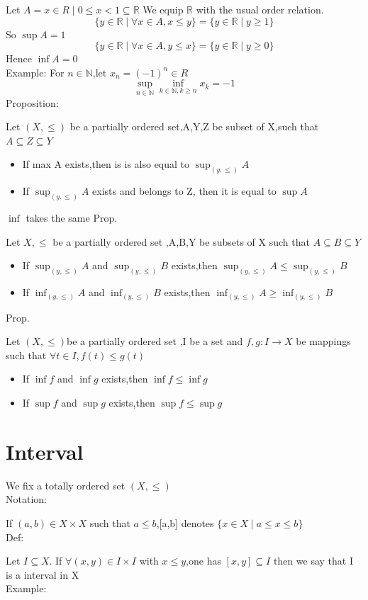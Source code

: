 \documentclass{book}
\begin{document}
Let $A={x\in R\mid 0\leq x<1}\subseteq \mathbb{R}$ We equip $\mathbb{R}$ with the usual order relation.$$\{y\in \mathbb{R}\mid \forall x\in A,x\leq y\}=\{y\in\mathbb{R}\mid y\geq 1\}$$
So $\sup A=1$
$$\{y\in \mathbb{R}\mid \forall x\in A,y\leq x\}=\{y\in\mathbb{R}\mid y\geq 0\}$$
Hence $\inf A=0$\\
Example: 
For $n\in \mathbb{N}$,let $x_n=(-1)^n\in R$ $$\sup\limits_{n\in \mathbb{N}}\inf\limits_{k\in \mathbb{N},k\geq n}x_k=-1$$
Proposition:

Let $(X,\leq)$ be a partially ordered set,A,Y,Z be subset of X,such that $A\subseteq Z\subseteq Y$
\begin{itemize}
    \item If max A exists,then is is also equal to $\sup_{(y,\leq)}A$
    \item If $\sup_{(y,\leq)}A$ exists and belongs to Z, then it is equal to $\sup A$
\end{itemize}

$\inf$ takes the same
Prop.

Let $X,\leq$ be a partially ordered set ,A,B,Y be subsets of X such that $A\subseteq B\subseteq Y$
\begin{itemize}
    \item If $\sup_{(y,\leq)}A$ and $\sup_{(y,\leq)}B$ exists,then $\sup_{(y,\leq)}A \leq \sup_{(y,\leq)}B$
    \item If $\inf_{(y,\leq)}A$ and $\inf_{(y,\leq)}B$ exists,then $\inf_{(y,\leq)}A \geq \inf_{(y,\leq)}B$
\end{itemize}
Prop.

Let $(X,\leq)$be a partially ordered set ,I be a set and $f,g:I\rightarrow X$ be mappings such that $\forall t\in I,f(t)\leq g(t)$
\begin{itemize}
    \item If $\inf f$ and $\inf g$ exists,then $\inf f\leq \inf g$ 
    \item If $\sup f$ and $\sup g$ exists,then $\sup f\leq \sup g$ 
\end{itemize}
\chapter{Interval}
We fix a totally ordered set $(X,\leq)$\\
Notation:

If $(a,b)\in X\times X $ such that $a\leq b $,[a,b] denotes $\{x\in X\mid a\leq x\leq b\}$\\
Def:

Let $I\subseteq X $. If $\forall(x,y)\in I\times I$ with $x\leq y$,one has $[x,y]\subseteq I$ then we say that I is a interval in X\\
Example:
\end{document}
